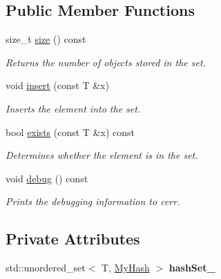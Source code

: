 \subsection*{Public Member Functions}
\begin{DoxyCompactItemize}
\item 
\hypertarget{class_std_hash_set_a663408a739a42a3f2b5e74e4097a354a}{size\-\_\-t \hyperlink{class_std_hash_set_a663408a739a42a3f2b5e74e4097a354a}{size} () const }\label{class_std_hash_set_a663408a739a42a3f2b5e74e4097a354a}

\begin{DoxyCompactList}\small\item\em Returns the number of objects stored in the set. \end{DoxyCompactList}\item 
\hypertarget{class_std_hash_set_a4e39ef224e2ee7d1c065c7f50e71aad5}{void \hyperlink{class_std_hash_set_a4e39ef224e2ee7d1c065c7f50e71aad5}{insert} (const T \&x)}\label{class_std_hash_set_a4e39ef224e2ee7d1c065c7f50e71aad5}

\begin{DoxyCompactList}\small\item\em Inserts the element into the set. \end{DoxyCompactList}\item 
\hypertarget{class_std_hash_set_a54040efb148792c1317ea6f892222a61}{bool \hyperlink{class_std_hash_set_a54040efb148792c1317ea6f892222a61}{exists} (const T \&x) const }\label{class_std_hash_set_a54040efb148792c1317ea6f892222a61}

\begin{DoxyCompactList}\small\item\em Determines whether the element is in the set. \end{DoxyCompactList}\item 
\hypertarget{class_std_hash_set_a23a35f0c0204e06b8dfa8becfab5fdfb}{void \hyperlink{class_std_hash_set_a23a35f0c0204e06b8dfa8becfab5fdfb}{debug} () const }\label{class_std_hash_set_a23a35f0c0204e06b8dfa8becfab5fdfb}

\begin{DoxyCompactList}\small\item\em Prints the debugging information to cerr. \end{DoxyCompactList}\end{DoxyCompactItemize}
\subsection*{Private Attributes}
\begin{DoxyCompactItemize}
\item 
\hypertarget{class_std_hash_set_ab4227f337aa0f9b76b1cd855ecdc8929}{std\-::unordered\-\_\-set$<$ T, \hyperlink{class_std_hash_set_1_1_my_hash}{My\-Hash} $>$ {\bfseries hash\-Set\-\_\-}}\label{class_std_hash_set_ab4227f337aa0f9b76b1cd855ecdc8929}

\end{DoxyCompactItemize}



